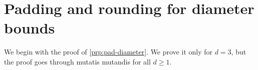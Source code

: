 


















































\appendix\setcounter{section}{4}\section{Padding and rounding for diameter bounds}\label{sec:rounding}

We begin with the proof of \cref{prp:pad-diameter}. We prove it only for $d = 3$, but the proof goes through mutatis mutandis for all $d \geq 1$.

